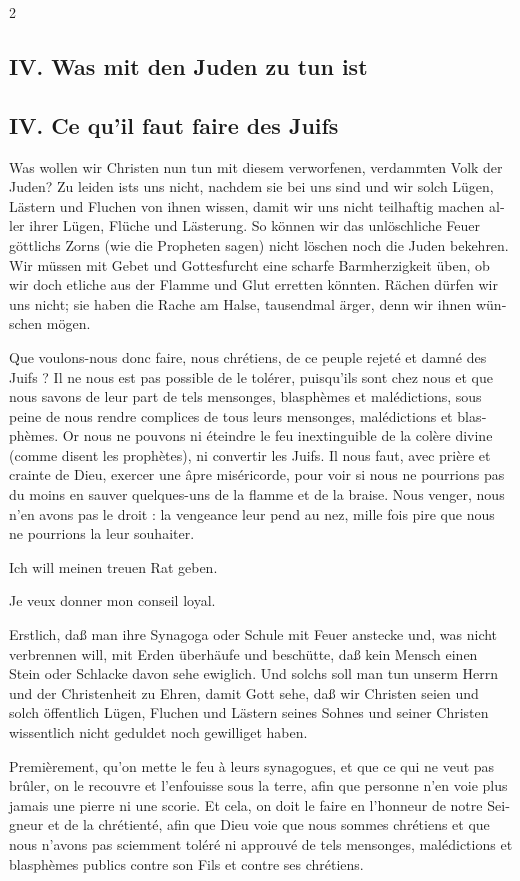 \documentclass[a4paper,12pt]{article}
\newcommand\chunks[2]{%
\begin{leftcolumn*}\begin{otherlanguage}{german}%
{#1}%
\end{otherlanguage}\end{leftcolumn*}%
\begin{rightcolumn}\begin{otherlanguage}{french}%
{#2}%
\end{otherlanguage}\end{rightcolumn}%
}
\begin{document}
\begin{paracol}{2}
  \chunks{\subsection*{IV. Was mit den Juden zu tun ist}}
         {\subsection*{IV. Ce qu’il faut faire des Juifs}}
  \chunks{Was wollen wir Christen nun tun mit diesem verworfenen, verdammten Volk der Juden? Zu leiden ists uns nicht, nachdem sie bei uns sind und wir solch Lügen, Lästern und Fluchen von ihnen wissen, damit wir uns nicht teilhaftig machen aller ihrer Lügen, Flüche und Lästerung. So können wir das unlöschliche Feuer göttlichs Zorns (wie die Propheten sagen) nicht löschen noch die Juden bekehren. Wir müssen mit Gebet und Gottesfurcht eine scharfe Barmherzigkeit üben, ob wir doch etliche aus der Flamme und Glut erretten könnten. Rächen dürfen wir uns nicht; sie haben die Rache am Halse, tausendmal ärger, denn wir ihnen wünschen mögen.}
         {Que voulons-nous donc faire, nous chrétiens, de ce peuple rejeté et damné des Juifs ? Il ne nous est pas possible de le tolérer, puisqu’ils sont chez nous et que nous savons de leur part de tels mensonges, blasphèmes et malédictions, sous peine de nous rendre complices de tous leurs mensonges, malédictions et blasphèmes. Or nous ne pouvons ni éteindre le feu inextinguible de la colère divine (comme disent les prophètes), ni convertir les Juifs. Il nous faut, avec prière et crainte de Dieu, exercer une âpre miséricorde, pour voir si nous ne pourrions pas du moins en sauver quelques-uns de la flamme et de la braise. Nous venger, nous n’en avons pas le droit : la vengeance leur pend au nez, mille fois pire que nous ne pourrions la leur souhaiter.}
  \chunks{Ich will meinen treuen Rat geben.}
         {Je veux donner mon conseil loyal.}
  \chunks{Erstlich, daß man ihre Synagoga oder Schule mit Feuer anstecke und, was nicht verbrennen will, mit Erden überhäufe und beschütte, daß kein Mensch einen Stein oder Schlacke davon sehe ewiglich. Und solchs soll man tun unserm Herrn und der Christenheit zu Ehren, damit Gott sehe, daß wir Christen seien und solch öffentlich Lügen, Fluchen und Lästern seines Sohnes und seiner Christen wissentlich nicht geduldet noch gewilliget haben.}
         {Premièrement, qu’on mette le feu à leurs synagogues, et que ce qui ne veut pas brûler, on le recouvre et l’enfouisse sous la terre, afin que personne n’en voie plus jamais une pierre ni une scorie. Et cela, on doit le faire en l’honneur de notre Seigneur et de la chrétienté, afin que Dieu voie que nous sommes chrétiens et que nous n’avons pas sciemment toléré ni approuvé de tels mensonges, malédictions et blasphèmes publics contre son Fils et contre ses chrétiens.}

\end{paracol}
\end{document}
